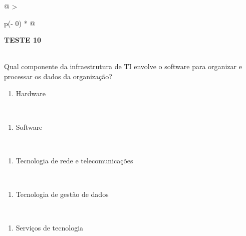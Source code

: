 \documentclass[
]{book}
\providecommand{\tightlist}{%
  \setlength{\itemsep}{0pt}\setlength{\parskip}{0pt}}
\begin{document}
\begin{longtable}[]{@{}
  >{\raggedright\arraybackslash}p{(\columnwidth - 0\tabcolsep) * }@{}}
\toprule\noalign{}
\begin{minipage}[b]{\linewidth}\raggedright
\textbf{TESTE 10}
\end{minipage} \\
\midrule\noalign{}
\endhead
\bottomrule\noalign{}
\endlastfoot
Qual componente da infraestrutura de TI envolve o software para organizar e processar os dados da organização? \\
\begin{minipage}[t]{\linewidth}\raggedright
\begin{enumerate}
\def\labelenumi{\Alph{enumi})}
\tightlist
\item
  Hardware
\end{enumerate}
\end{minipage} \\
\begin{minipage}[t]{\linewidth}\raggedright
\begin{enumerate}
\def\labelenumi{\Alph{enumi})}
\setcounter{enumi}{1}
\tightlist
\item
  Software
\end{enumerate}
\end{minipage} \\
\begin{minipage}[t]{\linewidth}\raggedright
\begin{enumerate}
\def\labelenumi{\Alph{enumi})}
\setcounter{enumi}{2}
\tightlist
\item
  Tecnologia de rede e telecomunicações
\end{enumerate}
\end{minipage} \\
\begin{minipage}[t]{\linewidth}\raggedright
\begin{enumerate}
\def\labelenumi{\Alph{enumi})}
\setcounter{enumi}{3}
\tightlist
\item
  Tecnologia de gestão de dados
\end{enumerate}
\end{minipage} \\
\begin{minipage}[t]{\linewidth}\raggedright
\begin{enumerate}
\def\labelenumi{\Alph{enumi})}
\setcounter{enumi}{4}
\tightlist
\item
  Serviços de tecnologia
\end{enumerate}
\end{minipage} \\
\end{longtable}
\end{document}
